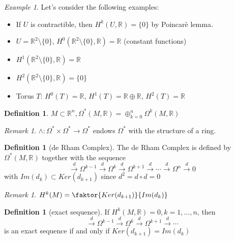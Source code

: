 \documentclass[a4paper,11pt,titlepage]{article}
\numberwithin{equation}{section}
\theoremstyle{definition}
\newtheorem{definition}[theorem]{Definition}
\theoremstyle{remark}
\newtheorem{remark}[theorem]{Remark}
\newtheorem{example}[theorem]{Example}
\newcommand{\rfield}{\mathbb{R}}
\begin{document}
\begin{example}
  Let's consider the following examples:
  \begin{itemize}
    \item If $U$ is contractible, then $H^k(U, \rfield) = \{0\}$ by Poincarè lemma.
    \item $U=\rfield^2 \setminus \{0\}$, $H^0(\rfield^2 \setminus \{0\}, \rfield) = \rfield$ (constant functions)
    \item $H^1(\rfield^2 \setminus \{0\}, \rfield) = \rfield$
    \item $H^2(\rfield^2 \setminus \{0\}, \rfield) = \{0\}$
    \item Torus $T$: $H^0(T) = \rfield$,  $H^1(T) = \rfield \oplus \rfield$, $H^2(T) = \rfield$
  \end{itemize}
\end{example}

\begin{definition}
  $M \subset \rfield^n, \Omega^*(M, \rfield) = \oplus_{k=0}^n \Omega^k(M, \rfield)$
\end{definition}

\begin{remark}
  $\wedge \colon \Omega^* \times \Omega^* \rightarrow \Omega^*$ endows $\Omega^*$ with the structure of a ring.
\end{remark}

\begin{definition}[de Rham Complex]
  The de Rham Complex is defined by $\Omega^*(M, \rfield)$ together with the sequence
  $$\overset{d}{\longrightarrow} \Omega^{k-1} \overset{d}{\longrightarrow} \Omega^{k} \overset{d}{\longrightarrow} \Omega^{k+1} \overset{d}{\longrightarrow} \cdots \overset{d}{\longrightarrow} \Omega^{n} \overset{d}{\longrightarrow} 0$$
  with $Im(d_k) \subset Ker(d_{k+1})$ since $d^2 = d \circ d = 0$
\end{definition}

\begin{remark}
  $H^k(M) = \faktor{Ker(d_{k+1})}{Im(d_k)}$
\end{remark}

\begin{definition} [exact sequence] \label{exsequence}
  If $H^k(M, \rfield) = 0, k=1, \ldots, n$, then
    $$\overset{d}{\longrightarrow} \Omega^{k-1} \overset{d}{\longrightarrow} \Omega^{k} \overset{d}{\longrightarrow} \Omega^{k+1} \overset{d}{\longrightarrow} \cdots $$
    is an exact sequence if and only if $Ker(d_{k+1}) = Im(d_k)$
\end{definition}
\end{document}
